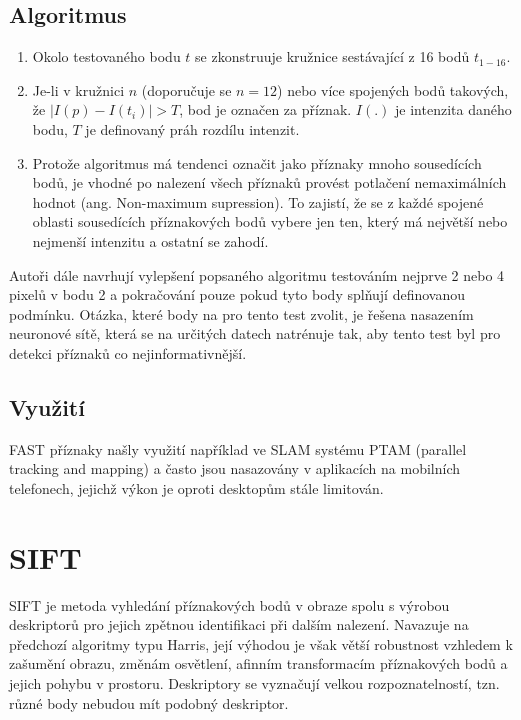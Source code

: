 	\subsection{Algoritmus}
	
		\begin{enumerate}
			\item Okolo testovaného bodu $t$ se zkonstruuje kružnice sestávající z 16 bodů $t_{1-16}$. 
			\item Je-li v kružnici $n$ (doporučuje se $n=12$) nebo více spojených bodů takových, že $\lvert I(p) - I(t_i) \rvert > T$, bod je označen za příznak. $I(.)$ je intenzita daného bodu, $T$ je definovaný práh rozdílu intenzit.
			\item Protože algoritmus má tendenci označit jako příznaky mnoho sousedících bodů, je vhodné po nalezení všech příznaků provést potlačení nemaximálních hodnot (ang. Non-maximum supression). To zajistí, že se z každé spojené oblasti sousedících příznakových bodů vybere jen ten, který má největší nebo nejmenší intenzitu a ostatní se zahodí.
		\end{enumerate}
		
		Autoři dále navrhují vylepšení popsaného algoritmu testováním nejprve 2 nebo 4 pixelů v bodu 2 a pokračování pouze pokud tyto body splňují definovanou podmínku. Otázka, které body na pro tento test zvolit, je řešena nasazením neuronové sítě, která se na určitých datech natrénuje tak, aby tento test byl pro detekci příznaků co nejinformativnější.
		
	\subsection{Využití}
	
		FAST příznaky našly využití například ve SLAM systému PTAM (parallel tracking and mapping) a často jsou nasazovány v aplikacích na mobilních telefonech, jejichž výkon je oproti desktopům stále limitován.	
	 

\section{SIFT}
\label{sec:sift}
	SIFT \cite{lowe2004distinctive} je metoda vyhledání příznakových bodů v obraze spolu s výrobou deskriptorů pro jejich zpětnou identifikaci při dalším nalezení. Navazuje na předchozí algoritmy typu Harris, její výhodou je však větší robustnost vzhledem k zašumění obrazu, změnám osvětlení, afinním transformacím příznakových bodů a jejich pohybu v prostoru. Deskriptory se vyznačují velkou rozpoznatelností, tzn. různé body nebudou mít podobný deskriptor.
	
